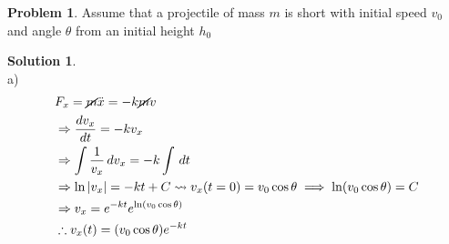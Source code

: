 \documentclass[10pt]{article}
\theoremstyle{definition}
\newtheorem{problem}{Problem}
\newtheorem{soln}{Solution}
\begin{document}
\begin{problem}
Assume that a projectile of mass $m$ is short with initial speed $v_0$ and angle $\theta$ from an initial height $h_0$
\end{problem}
\begin{soln} ~\\
     a)
     \begin{align*}
           & F_x=\cancel{m}\ddot{x}=-k\cancel{m}v                                                                    \\
           & \Rightarrow \frac{dv_x}{dt}=-kv_x                                                                       \\
           & \Rightarrow \int \frac{1}{v_x} \,dv_x = -k\int\,dt                                                      \\
           & \Rightarrow \ln \abs{v_x} = -kt+C \rightsquigarrow v_x(t=0)=v_0\cos\theta \implies \ln(v_0\cos\theta)=C \\
           & \Rightarrow v_x = e^{-kt}e^{\ln(v_0\cos\theta)}                                                         \\
           & \therefore v_x(t) = (v_0\cos\theta)e^{-kt}                                                              \\
     \end{align*}


\end{soln}
\end{document}
